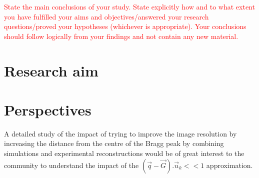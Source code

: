 \textcolor{red}{State the main conclusions of your study. State explicitly how and to what extent you have fulfilled your aims and objectives/answered your research questions/proved your hypotheses (whichever is appropriate). Your conclusions should follow logically from your findings and not contain any new material.}

\section{Research aim}


\section{Perspectives}

A detailed study of the impact of trying to improve the image resolution by increasing the distance from the centre of the Bragg peak by combining simulations and experimental reconstructions would be of great interest to the community to understand the impact of the $(\vec{q}-\vec{G}).\vec{u}_k<<1$ approximation.
